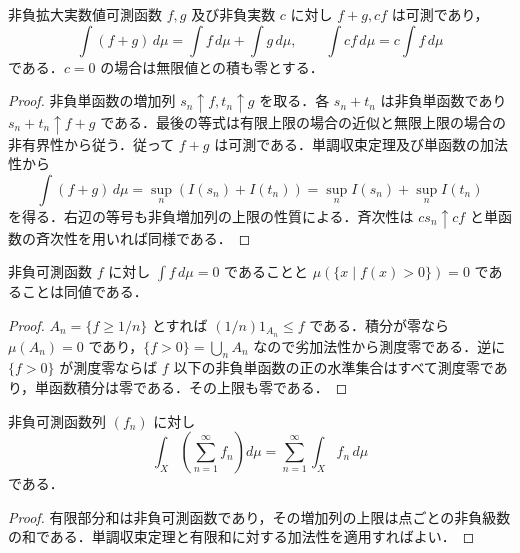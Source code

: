 \begin{prop}[非負積分の加法性と斉次性]
非負拡大実数値可測函数 $f,g$ 及び非負実数 $c$ に対し $f+g,cf$ は可測であり，
\[
 \int(f+g)\,d\mu=\int f\,d\mu+\int g\,d\mu,\qquad
 \int cf\,d\mu=c\int f\,d\mu
\]
である．$c=0$ の場合は無限値との積も零とする．
\end{prop}
\begin{proof}
非負単函数の増加列 $s_n\uparrow f,t_n\uparrow g$ を取る．各 $s_n+t_n$ は非負単函数であり $s_n+t_n\uparrow f+g$ である．最後の等式は有限上限の場合の近似と無限上限の場合の非有界性から従う．従って $f+g$ は可測である．単調収束定理及び単函数の加法性から
\[
 \int(f+g)\,d\mu=\sup_n(I(s_n)+I(t_n))
 =\sup_n I(s_n)+\sup_n I(t_n)
\]
を得る．右辺の等号も非負増加列の上限の性質による．斉次性は $cs_n\uparrow cf$ と単函数の斉次性を用いれば同様である．
\end{proof}
\begin{prop}[非負積分が零となる条件]
非負可測函数 $f$ に対し $\int f\,d\mu=0$ であることと $\mu(\{x\mid f(x)>0\})=0$ であることは同値である．
\end{prop}
\begin{proof}
$A_n=\{f\geq1/n\}$ とすれば $(1/n)1_{A_n}\leq f$ である．積分が零なら $\mu(A_n)=0$ であり，$\{f>0\}=\bigcup_n A_n$ なので劣加法性から測度零である．逆に $\{f>0\}$ が測度零ならば $f$ 以下の非負単函数の正の水準集合はすべて測度零であり，単函数積分は零である．その上限も零である．
\end{proof}
\begin{prop}[非負函数の級数と積分]
非負可測函数列 $(f_n)$ に対し
\[
 \int_X\left(\sum_{n=1}^\infty f_n\right)d\mu
 =\sum_{n=1}^\infty\int_X f_n\,d\mu
\]
である．
\end{prop}
\begin{proof}
有限部分和は非負可測函数であり，その増加列の上限は点ごとの非負級数の和である．単調収束定理と有限和に対する加法性を適用すればよい．
\end{proof}
